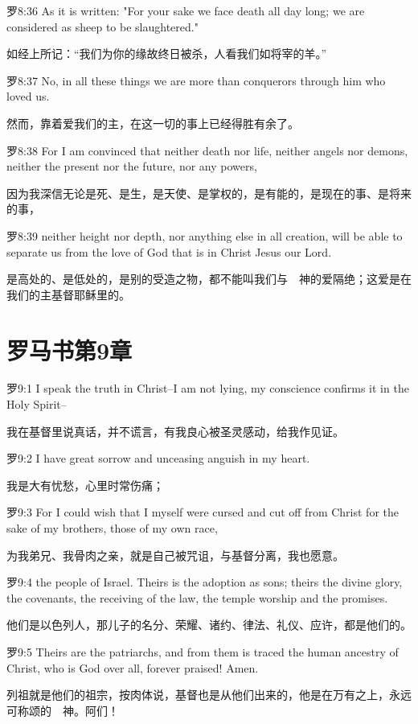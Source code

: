 \documentclass[a4paper,11pt,onecolumn,twoside]{ctexart}
\begin{document}
\begin{multicols}{2}
 罗8:36
 As it is written: "For your sake we face death all day long; we are considered as sheep to be slaughtered."

 如经上所记：“我们为你的缘故终日被杀，人看我们如将宰的羊。”


 罗8:37
 No, in all these things we are more than conquerors through him who loved us.

 然而，靠着爱我们的主，在这一切的事上已经得胜有余了。


 罗8:38
 For I am convinced that neither death nor life, neither angels nor demons, neither the present nor the future, nor any powers,

 因为我深信无论是死、是生，是天使、是掌权的，是有能的，是现在的事、是将来的事，


 罗8:39
 neither height nor depth, nor anything else in all creation, will be able to separate us from the love of God that is in Christ Jesus our Lord.

 是高处的、是低处的，是别的受造之物，都不能叫我们与　神的爱隔绝；这爱是在我们的主基督耶稣里的。


\section{ 罗马书第9章}
 罗9:1
 I speak the truth in Christ--I am not lying, my conscience confirms it in the Holy Spirit--

 我在基督里说真话，并不谎言，有我良心被圣灵感动，给我作见证。


 罗9:2
 I have great sorrow and unceasing anguish in my heart.

 我是大有忧愁，心里时常伤痛；


 罗9:3
 For I could wish that I myself were cursed and cut off from Christ for the sake of my brothers, those of my own race,

 为我弟兄、我骨肉之亲，就是自己被咒诅，与基督分离，我也愿意。


 罗9:4
 the people of Israel. Theirs is the adoption as sons; theirs the divine glory, the covenants, the receiving of the law, the temple worship and the promises.

 他们是以色列人，那儿子的名分、荣耀、诸约、律法、礼仪、应许，都是他们的。


 罗9:5
 Theirs are the patriarchs, and from them is traced the human ancestry of Christ, who is God over all, forever praised! Amen.

 列祖就是他们的祖宗，按肉体说，基督也是从他们出来的，他是在万有之上，永远可称颂的　神。阿们！



\end{multicols}
\end{document}
